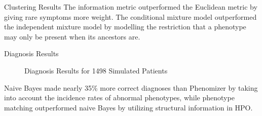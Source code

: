 \documentclass[final]{beamer} %
\begin{document}
\begin{frame}{}
\begin{columns}[T]
\begin{column}{0.3\linewidth}
{\begin{block}{\Huge Clustering Results }
       The information metric outperformed the Euclidean metric by
       giving rare symptoms more weight. The conditional mixture model
       outperformed the independent mixture model by modelling the
       restriction that a phenotype may only be present when its
       ancestors are.
     \end{block}
     \vfill
     \begin{block}{\Huge Diagnosis Results}
       \begin{figure}
         \centering
         \vspace{0.5cm}
         \caption*{\large Diagnosis Results for 1498 Simulated
           Patients}
       \end{figure}
       \Large Naive Bayes made nearly 35\% more correct diagnoses than
       Phenomizer by taking into account the incidence rates of
       abnormal phenotypes, while phenotype matching outperformed
       naive Bayes by utilizing structural information in HPO.

     \end{block}
   }
 \end{column}

\end{columns}
\end{frame}
\end{document}

